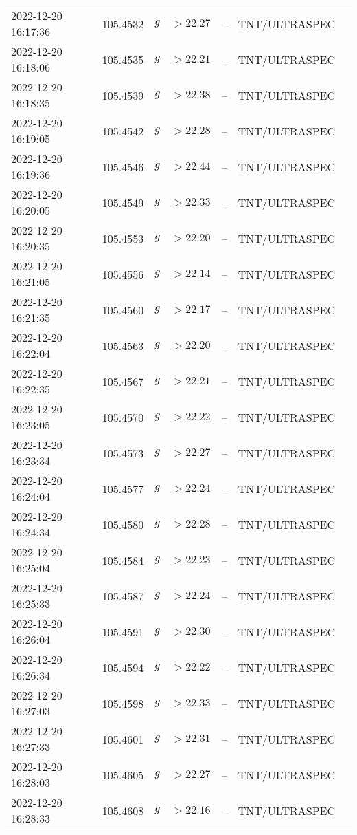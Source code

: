 \documentclass{nature_plusfigure}
\begin{document}
\begin{supplement}
\begin{center}
\begin{longtable}{lllllll}
2022-12-20 16:17:36 & 105.4532 & $g$ & $>22.27$ & -- & TNT/ULTRASPEC &  \\ 
2022-12-20 16:18:06 & 105.4535 & $g$ & $>22.21$ & -- & TNT/ULTRASPEC &  \\ 
2022-12-20 16:18:35 & 105.4539 & $g$ & $>22.38$ & -- & TNT/ULTRASPEC &  \\ 
2022-12-20 16:19:05 & 105.4542 & $g$ & $>22.28$ & -- & TNT/ULTRASPEC &  \\ 
2022-12-20 16:19:36 & 105.4546 & $g$ & $>22.44$ & -- & TNT/ULTRASPEC &  \\ 
2022-12-20 16:20:05 & 105.4549 & $g$ & $>22.33$ & -- & TNT/ULTRASPEC &  \\ 
2022-12-20 16:20:35 & 105.4553 & $g$ & $>22.20$ & -- & TNT/ULTRASPEC &  \\ 
2022-12-20 16:21:05 & 105.4556 & $g$ & $>22.14$ & -- & TNT/ULTRASPEC &  \\ 
2022-12-20 16:21:35 & 105.4560 & $g$ & $>22.17$ & -- & TNT/ULTRASPEC &  \\ 
2022-12-20 16:22:04 & 105.4563 & $g$ & $>22.20$ & -- & TNT/ULTRASPEC &  \\ 
2022-12-20 16:22:35 & 105.4567 & $g$ & $>22.21$ & -- & TNT/ULTRASPEC &  \\ 
2022-12-20 16:23:05 & 105.4570 & $g$ & $>22.22$ & -- & TNT/ULTRASPEC &  \\ 
2022-12-20 16:23:34 & 105.4573 & $g$ & $>22.27$ & -- & TNT/ULTRASPEC &  \\ 
2022-12-20 16:24:04 & 105.4577 & $g$ & $>22.24$ & -- & TNT/ULTRASPEC &  \\ 
2022-12-20 16:24:34 & 105.4580 & $g$ & $>22.28$ & -- & TNT/ULTRASPEC &  \\ 
2022-12-20 16:25:04 & 105.4584 & $g$ & $>22.23$ & -- & TNT/ULTRASPEC &  \\ 
2022-12-20 16:25:33 & 105.4587 & $g$ & $>22.24$ & -- & TNT/ULTRASPEC &  \\ 
2022-12-20 16:26:04 & 105.4591 & $g$ & $>22.30$ & -- & TNT/ULTRASPEC &  \\ 
2022-12-20 16:26:34 & 105.4594 & $g$ & $>22.22$ & -- & TNT/ULTRASPEC &  \\ 
2022-12-20 16:27:03 & 105.4598 & $g$ & $>22.33$ & -- & TNT/ULTRASPEC &  \\ 
2022-12-20 16:27:33 & 105.4601 & $g$ & $>22.31$ & -- & TNT/ULTRASPEC &  \\ 
2022-12-20 16:28:03 & 105.4605 & $g$ & $>22.27$ & -- & TNT/ULTRASPEC &  \\ 
2022-12-20 16:28:33 & 105.4608 & $g$ & $>22.16$ & -- & TNT/ULTRASPEC &  \\ 

\end{longtable}
\end{center}
\end{supplement}
\end{document}
